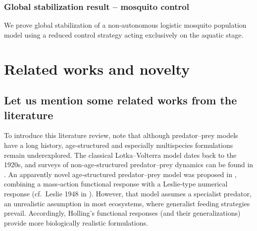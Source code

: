 \documentclass[10pt, a4paper]{amsart}
\newcounter{assu}
\theoremstyle{plain}
\theoremstyle{definition}
\theoremstyle{remark}
\numberwithin{equation}{section}
\begin{document}
\subsubsection*{\bf Global stabilization result – mosquito control}
We prove global stabilization of a non-autonomous logistic mosquito population model using a reduced control strategy acting exclusively on the aquatic stage.

\section*{\bf Related works and novelty}%
\subsection*{Let us mention some related works from the literature}
To introduce this literature review, note that although predator–prey models have a long history, age‐structured and especially multispecies formulations remain underexplored.  The classical Lotka–Volterra model dates back to the 1920s, and surveys of non‐age‐structured predator–prey dynamics can be found in \cite{ref5,ref3}.  An apparently novel age‐structured predator–prey model was proposed in \cite{ref45}, combining a mass‐action functional response with a Leslie‐type numerical response (cf.\ Leslie 1948 in \cite{ref3}).  However, that model assumes a specialist predator, an unrealistic assumption in most ecosystems, where generalist feeding strategies prevail.  Accordingly, Holling’s functional responses (and their generalizations) provide more biologically realistic formulations.
\end{document}

